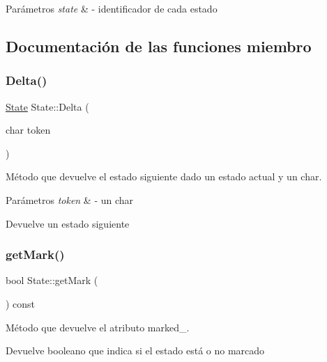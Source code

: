 \begin{DoxyParams}{Parámetros}
{\em state} & -\/ identificador de cada estado \\
\hline
\end{DoxyParams}


\subsection{Documentación de las funciones miembro}
\mbox{\label{classState_a02357cf169ab1d60222aa97997fecdbd}} 
\subsubsection{\texorpdfstring{Delta()}{Delta()}}
{\footnotesize\ttfamily \hyperlink{classState}{State} State\+::\+Delta (\begin{DoxyParamCaption}\item[{char}]{token }\end{DoxyParamCaption})}



Método que devuelve el estado siguiente dado un estado actual y un char. 


\begin{DoxyParams}{Parámetros}
{\em token} & -\/ un char \\
\hline
\end{DoxyParams}
\begin{DoxyReturn}{Devuelve}
un estado siguiente 
\end{DoxyReturn}
\mbox{\label{classState_a47d35b17a579ff3c15989efea2d91398}} 
\subsubsection{\texorpdfstring{get\+Mark()}{getMark()}}
{\footnotesize\ttfamily bool State\+::get\+Mark (\begin{DoxyParamCaption}{ }\end{DoxyParamCaption}) const}



Método que devuelve el atributo marked\+\_\+. 

\begin{DoxyReturn}{Devuelve}
booleano que indica si el estado está o no marcado 
\end{DoxyReturn}
\mbox{\label{classState_acb82f32f51c4d5db3743a3904b22cc75}} 
